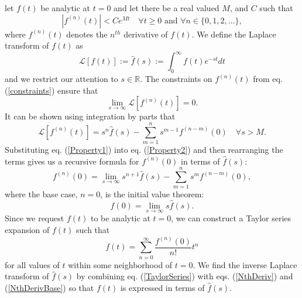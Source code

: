 \documentclass[extra]{gji}
\begin{document}
let $f(t)$ be analytic at $t=0$ and let there
  be a real valued $M$, and $C$ such that
\begin{equation}\label{constraints}
  \left|f^{(n)}(t)\right| < Ce^{Mt}\quad \forall t\geq 0\text{ and }\forall n\in\{0,1,2,\dots\},
\end{equation}
where $f^{(n)}(t)$ denotes the $n^{th}$ derivative of $f(t)$.  We
define the Laplace transform of $f(t)$ as
\begin{equation}
  \mathcal{L}[f(t)] := \hat{f}(s) := \int_{0}^\infty f(t)e^{-st}dt
\end{equation}
and we restrict our attention to $s\in\mathbb{R}$.  The constraints on
$f^{(n)}(t)$ from eq. (\ref{constraints}) ensure that
\begin{equation}\label{Property2}
  \lim_{s \to \infty}\mathcal{L}[f^{(n)}(t)] = 0.
\end{equation}
It can be shown using integration by parts that
\begin{equation}\label{Property1}
  \mathcal{L}[f^{(n)}(t)] = s^n\hat{f}(s) - \sum_{m=1}^ns^{m-1}f^{(n-m)}(0)
  \quad \forall s>M.
\end{equation}
Substituting eq. (\ref{Property1}) into eq. (\ref{Property2}) and then
rearranging the terms gives us a recursive formula for $f^{(n)}(0)$ in
terms of $\hat{f}(s)$:
\begin{equation}\label{NthDeriv}
  f^{(n)}(0) = \lim_{s \to \infty} s^{n + 1}\hat{f}(s) -
               \sum_{m=1}^{n} s^{m}f^{(n-m)}(0),
\end{equation}
where the base case, $n=0$, is the initial value theorem:
\begin{equation}\label{NthDerivBase}
  f(0) = \lim_{s \to \infty} s\hat{f}(s).
\end{equation}
Since we request $f(t)$ to be analytic at $t=0$, we can construct a
Taylor series expansion of $f(t)$ such that
\begin{equation}\label{TaylorSeries}
  f(t) = \sum_{n=0}^\infty\frac{f^{(n)}(0)}{n!}t^n
\end{equation}
for all values of $t$ within some neighborhood of $t=0$. We find the
inverse Laplace transform of $\hat{f}(s)$ by combining
eq. (\ref{TaylorSeries}) with eqs. (\ref{NthDeriv}) and
(\ref{NthDerivBase}) so that $f(t)$ is expressed in terms of
$\hat{f}(s)$.
\end{document}
